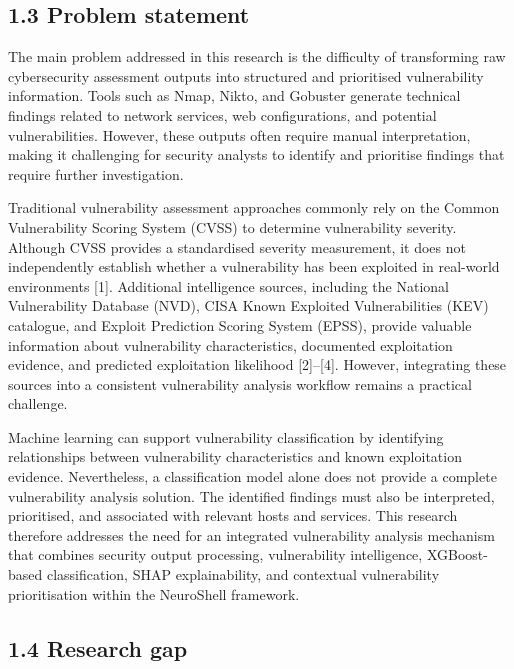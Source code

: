 \documentclass[
]{article}
\begin{document}
\hypertarget{problem-statement}{%
\subsection{1.3 Problem statement}\label{problem-statement}}

The main problem addressed in this research is the difficulty of
transforming raw cybersecurity assessment outputs into structured and
prioritised vulnerability information. Tools such as Nmap, Nikto, and
Gobuster generate technical findings related to network services, web
configurations, and potential vulnerabilities. However, these outputs
often require manual interpretation, making it challenging for security
analysts to identify and prioritise findings that require further
investigation.

Traditional vulnerability assessment approaches commonly rely on the
Common Vulnerability Scoring System (CVSS) to determine vulnerability
severity. Although CVSS provides a standardised severity measurement, it
does not independently establish whether a vulnerability has been
exploited in real-world environments {[}1{]}. Additional intelligence
sources, including the National Vulnerability Database (NVD), CISA Known
Exploited Vulnerabilities (KEV) catalogue, and Exploit Prediction
Scoring System (EPSS), provide valuable information about vulnerability
characteristics, documented exploitation evidence, and predicted
exploitation likelihood {[}2{]}--{[}4{]}. However, integrating these
sources into a consistent vulnerability analysis workflow remains a
practical challenge.

Machine learning can support vulnerability classification by identifying
relationships between vulnerability characteristics and known
exploitation evidence. Nevertheless, a classification model alone does
not provide a complete vulnerability analysis solution. The identified
findings must also be interpreted, prioritised, and associated with
relevant hosts and services. This research therefore addresses the need
for an integrated vulnerability analysis mechanism that combines
security output processing, vulnerability intelligence, XGBoost-based
classification, SHAP explainability, and contextual vulnerability
prioritisation within the NeuroShell framework.

\hypertarget{research-gap}{%
\subsection{1.4 Research gap}\label{research-gap}}
\end{document}
